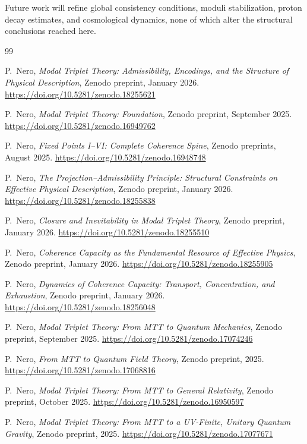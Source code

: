 \documentclass[11pt]{article}
\begin{document}
Future work will refine global consistency conditions, moduli
stabilization, proton decay estimates, and cosmological dynamics, none
of which alter the structural conclusions reached here.
\begin{thebibliography}{99}

P.~Nero,
\emph{Modal Triplet Theory: Admissibility, Encodings, and the Structure of Physical Description},
Zenodo preprint, January 2026.
\url{https://doi.org/10.5281/zenodo.18255621}

P.~Nero,
\emph{Modal Triplet Theory: Foundation},
Zenodo preprint, September 2025.
\url{https://doi.org/10.5281/zenodo.16949762}

P.~Nero,
\emph{Fixed Points I--VI: Complete Coherence Spine},
Zenodo preprints, August 2025.
\url{https://doi.org/10.5281/zenodo.16948748}

P.~Nero,
\emph{The Projection--Admissibility Principle: Structural Constraints on Effective Physical Description},
Zenodo preprint, January 2026.
\url{https://doi.org/10.5281/zenodo.18255838}

P.~Nero,
\emph{Closure and Inevitability in Modal Triplet Theory},
Zenodo preprint, January 2026.
\url{https://doi.org/10.5281/zenodo.18255510}

P.~Nero,
\emph{Coherence Capacity as the Fundamental Resource of Effective Physics},
Zenodo preprint, January 2026.
\url{https://doi.org/10.5281/zenodo.18255905}

P.~Nero,
\emph{Dynamics of Coherence Capacity: Transport, Concentration, and Exhaustion},
Zenodo preprint, January 2026.
\url{https://doi.org/10.5281/zenodo.18256048}

P.~Nero,
\emph{Modal Triplet Theory: From MTT to Quantum Mechanics},
Zenodo preprint, September 2025.
\url{https://doi.org/10.5281/zenodo.17074246}

P.~Nero,
\emph{From MTT to Quantum Field Theory},
Zenodo preprint, 2025.
\url{https://doi.org/10.5281/zenodo.17068816}

P.~Nero,
\emph{Modal Triplet Theory: From MTT to General Relativity},
Zenodo preprint, October 2025.
\url{https://doi.org/10.5281/zenodo.16950597}

P.~Nero,
\emph{Modal Triplet Theory: From MTT to a UV-Finite, Unitary Quantum Gravity},
Zenodo preprint, 2025.
\url{https://doi.org/10.5281/zenodo.17077671}


\end{thebibliography}
\end{document}
